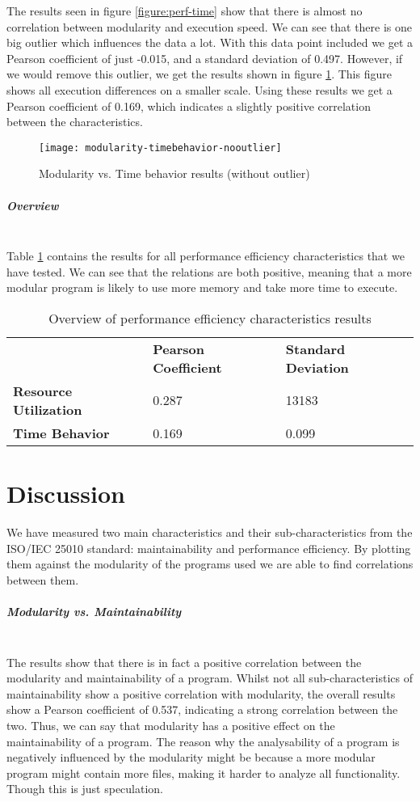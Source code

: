 \documentclass[twoside]{uva-inf-bachelor-thesis}
\newcommand{\myparagraph}[1]{\paragraph{#1}\mbox{}\\}
\begin{document}
The results seen in figure \ref{figure:perf-time} show that there is almost no correlation between modularity and execution speed. We can see that there is one big outlier which influences the data a lot. With this data point included we get a Pearson coefficient of just -0.015, and a standard deviation of 0.497. However, if we would remove this outlier, we get the results shown in figure \ref{figure:perf-time-no}. This figure shows all execution differences on a smaller scale. Using these results we get a Pearson coefficient of 0.169, which indicates a slightly positive correlation between the characteristics.

\begin{figure}[H]
    \label{figure:perf-time-no}
    \caption{Modularity vs. Time behavior results (without outlier)}
    \centering
        \texttt{[image: modularity-timebehavior-nooutlier]}
\end{figure}

\myparagraph{Overview}
Table \ref{table:perf-overview} contains the results for all performance efficiency characteristics that we have tested. We can see that the relations are both positive, meaning that a more modular program is likely to use more memory and take more time to execute.

\begin{table}[H]
\centering
\caption{Overview of performance efficiency characteristics results}
\label{table:perf-overview}
\begin{tabular}{lll}
                              & \textbf{Pearson Coefficient} & \textbf{Standard Deviation} \\
\textbf{Resource Utilization} & 0.287                        & 13183                       \\
\textbf{Time Behavior}        & 0.169                        & 0.099                      
\end{tabular}
\end{table}

\chapter{Discussion}
We have measured two main characteristics and their sub-characteristics from the ISO/IEC 25010 standard: maintainability and performance efficiency. By plotting them against the modularity of the programs used we are able to find correlations between them.

\myparagraph{Modularity vs. Maintainability}
The results show that there is in fact a positive correlation between the modularity and maintainability of a program. Whilst not all sub-characteristics of maintainability show a positive correlation with modularity, the overall results show a Pearson coefficient of 0.537, indicating a strong correlation between the two. Thus, we can say that modularity has a positive effect on the maintainability of a program. The reason why the analysability of a program is negatively influenced by the modularity might be because a more modular program might contain more files, making it harder to analyze all functionality. Though this is just speculation.
\end{document}
